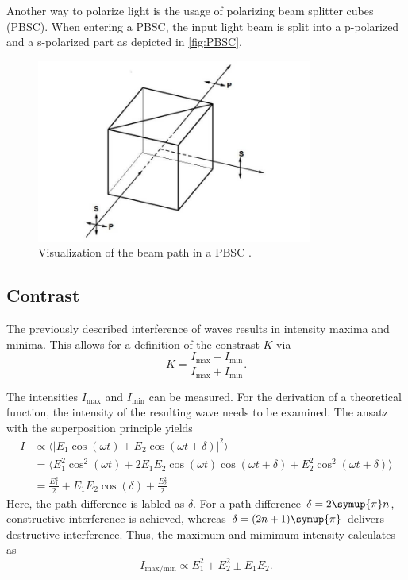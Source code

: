 Another way to polarize light is the usage of polarizing beam splitter cubes (PBSC). When entering a PBSC, the input light beam is split into a p-polarized and 
a s-polarized part as depicted in \autoref{fig:PBSC}.
\begin{figure}
    \centering
    \includegraphics[height=6cm]{content/pics/PBSC.jpg}
    \caption{Visualization of the beam path in a PBSC \cite{artifex-PBSC}.}
    \label{fig:PBSC}
\end{figure}

\subsection{Contrast}
\label{sec:Contrast}
The previously described interference of waves results in intensity maxima and minima. This allows for a definition of the constrast $K$ via
\begin{equation}
    K = \frac{I_{\text{max}} - I_{\text{min}}}{I_{\text{max}} + I_{\text{min}}}.
    \label{eq:Contrast}
\end{equation}

The intensities $I_{\text{max}}$ and $I_{\text{min}}$ can be measured. For the derivation of a theoretical function, the intensity of the resulting wave needs to be examined.
The ansatz with the superposition principle yields
\begin{align*}
    I &\propto \langle|E_1\cos(\omega t) + E_2\cos(\omega t + \delta)|^2\rangle \\
      &= \langle E_1^2\cos^2(\omega t) + 2E_1E_2\cos(\omega t)\cos(\omega t + \delta)+ E_2^2\cos^2(\omega t + \delta)\rangle \\
      &= \frac{E_1^2}{2} + E_1E_2 \cos(\delta) + \frac{E_2^2}{2}
\end{align*}
Here, the path difference is labled as $\delta$. For a path difference $\delta = 2\symup{\pi}n$, constructive interference is achieved, whereas 
$\delta = (2n+1)\symup{\pi}$ delivers destructive interference. Thus, the maximum and mimimum intensity calculates as
\begin{equation*}
    I_{\text{max/min}} \propto E_1^2 + E_2^2 \pm E_1 E_2.
    \label{eq:I_max/min_temp}
\end{equation*}

